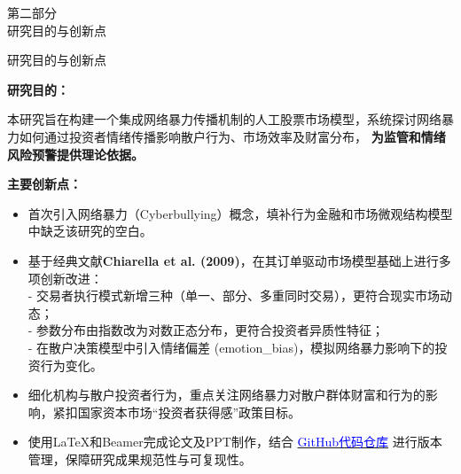 \begin{frame}
    \begin{center}
        \textcolor{NJU_purple}{\Large 第二部分} \\[1.5em]
        \textcolor{NJU_purple}{\Huge 研究目的与创新点}
    \end{center}
\end{frame}



\begin{frame}{研究目的与创新点}

    
    \justifying
    \footnotesize
    \setlength{\parskip}{0.3em}
    
    
    \textbf{\large 研究目的：}
    
    \vspace{0.2cm} %
    
    本研究旨在构建一个集成网络暴力传播机制的人工股票市场模型，系统探讨网络暴力如何通过投资者情绪传播影响散户行为、市场效率及财富分布，
    \alert{\textbf{为监管和情绪风险预警提供理论依据。}}
    
    \vspace{0.5cm}
    
    \textbf{\large 主要创新点：}
    \begin{itemize}
      \item \alert{首次引入网络暴力（Cyberbullying）概念}，填补行为金融和市场微观结构模型中缺乏该研究的空白。
      
      \item 基于经典文献\textbf{Chiarella et al. (2009)}，在其订单驱动市场模型基础上进行多项创新改进：\\
      \hspace{1em} - 交易者执行模式新增三种（单一、部分、多重同时交易），更符合现实市场动态；\\
      \hspace{1em} - 参数分布由指数改为\alert{对数正态分布}，更符合投资者异质性特征；\\
      \hspace{1em} - 在散户决策模型中引入\alert{情绪偏差 (emotion\_bias)}，模拟网络暴力影响下的投资行为变化。
      
      \item 细化机构与散户投资者行为，重点关注网络暴力对\alert{散户群体财富和行为}的影响，紧扣国家资本市场“投资者获得感”政策目标。
      
      \item 使用\alert{LaTeX和Beamer完成论文及PPT制作}，结合
      \href{https://github.com/haofeixin/Graduaction-Project}{\textcolor{blue}{GitHub代码仓库}}
      进行版本管理，保障研究成果规范性与可复现性。
    \end{itemize}
    
    \end{frame}
    